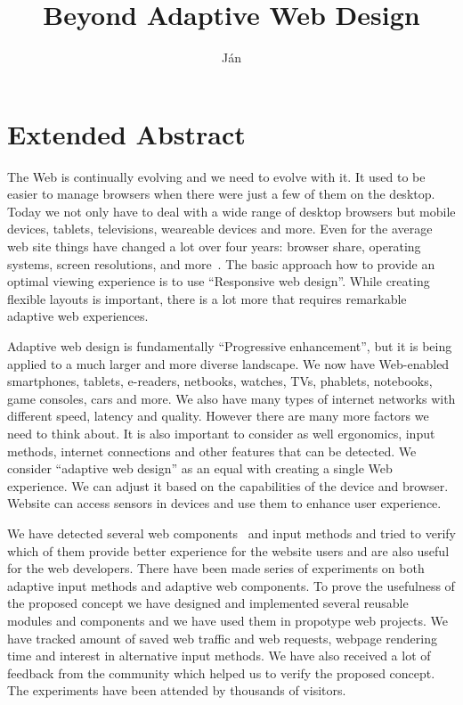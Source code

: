 \documentclass{iitsrc}
\title{Beyond Adaptive Web Design}
\author{Ján}{Antala}
\begin{document}
\section*{Extended Abstract}

The Web is continually evolving and we need to evolve with it. It used to be easier to manage browsers when there were just a few of them on the desktop. Today we not only have to deal with a wide range of desktop browsers but mobile devices, tablets, televisions, weareable devices and more. Even for the average web site things have changed a lot over four years: browser share, operating systems, screen resolutions, and more~\cite{ui17}. The basic approach how to provide an optimal viewing experience is to use ``Responsive web design''. While creating flexible layouts is important, there is a lot more that requires remarkable adaptive web experiences.

Adaptive web design is fundamentally ``Progressive enhancement'', but it is being applied to a much larger and more diverse landscape. We now have Web-enabled smartphones, tablets, e-readers, netbooks, watches, TVs, phablets, notebooks, game consoles, cars and more. We also have many types of internet networks with different speed, latency and quality. However there are many more factors we need to think about. It is also important to consider as well ergonomics, input methods, internet connections and other features that can be detected. We consider ``adaptive web design'' as an equal with creating a single Web experience. We can adjust it based on the capabilities of the device and browser. Website can access sensors in devices and use them to enhance user experience.


We have detected several web components~\cite{webcomponents} and input methods and tried to verify which of them provide better experience for the website users and are also useful for the web developers. There have been made series of experiments on both adaptive input methods and adaptive web components. To prove the usefulness of the proposed concept we have designed and implemented several reusable modules and components and we have used them in propotype web projects. We have tracked amount of saved web traffic and web requests, webpage rendering time and interest in alternative input methods. We have also received a lot of feedback from the community which helped us to verify the proposed concept. The experiments have been attended by thousands of visitors.
\end{document}
